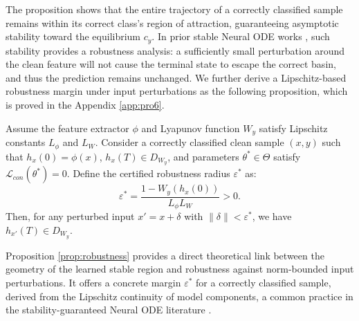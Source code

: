 \documentclass[journal]{IEEEtran}
\begin{document}
The proposition shows that the entire trajectory of a correctly classified sample remains within its correct class's region of attraction, guaranteeing asymptotic stability toward the equilibrium $c_y$. In prior stable Neural ODE works \cite{NEURIPS2021_7d5430cf}, such stability provides a robustness analysis: a sufficiently small perturbation around the clean feature will not cause the terminal state to escape the correct basin, and thus the prediction remains unchanged. We further derive a Lipschitz-based robustness margin under input perturbations as the following proposition, which is proved in the Appendix \ref{app:pro6}.

\begin{proposition}	\label{prop:robustness}
Assume the feature extractor $\phi$ and Lyapunov function $W_y$ satisfy Lipschitz constants $L_\phi$ and  $L_W$. Consider a correctly classified clean sample $(x,y)$ such that $h_x(0)=\phi(x)$, $h_x(T)\in D_{W_y}$, and parameters $\theta^*\in\Theta$ satisfy $\mathcal{L}_{con}(\theta^*)=0$. Define the certified robustness radius $\varepsilon^*$ as:
\begin{equation}\label{eq:certified_radius}
\varepsilon^* = \frac{1 - W_y(h_x(0))}{L_\phi L_W} >0.
\end{equation}
Then, for any perturbed input $x' = x + \delta$ with $\|\delta\| < \varepsilon^*$, we have $h_{x'}(T) \in D_{W_y}$.
\end{proposition}

Proposition \ref{prop:robustness} provides a direct theoretical link between the geometry of the learned stable region and robustness against norm-bounded input perturbations. It offers a concrete margin $\varepsilon^*$ for a correctly classified sample, derived from the Lipschitz continuity of model components, a common practice in the stability-guaranteed Neural ODE literature \cite{pmlr-v162-rodriguez22a, LUO2025107219}. 
\end{document}
